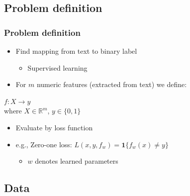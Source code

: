 \documentclass{beamer}
\begin{document}
\subsection{Problem definition}
\begin{frame}
	\frametitle{Problem definition}
	\begin{itemize}
		\item Find mapping from text to binary label
		\begin{itemize}
			\item Supervised learning
		\end{itemize} \pause
		\item For $m$ numeric features (extracted from text) we define:
	\end{itemize}
	\begin{definition}
		\center
		$f: X \to y$ \\
		where $X \in \mathbb{R}^{m}$, $y \in \{0,1\}$
	\end{definition}
	\pause
	\begin{itemize}
		\item Evaluate by loss function
		\item e.g., Zero-one loss: $L(x,y,f_w)=\textbf{1}\{ f_w(x) \neq y \}$
		\begin{itemize}
			\item $w$ denotes learned parameters
		\end{itemize}
	\end{itemize}
\end{frame}

\subsection{Data}
\end{document}
